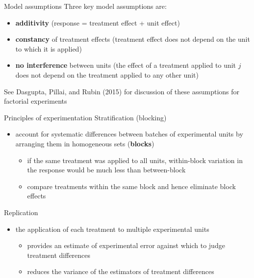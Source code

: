 \documentclass[
  ignorenonframetext,
]{beamer}
\providecommand{\tightlist}{%
  \setlength{\itemsep}{0pt}\setlength{\parskip}{0pt}}
\begin{document}
\begin{frame}{Model assumptions}
\protect\hypertarget{model-assumptions}{}
Three key model assumptions are:

\begin{itemize}
\tightlist
\item
  \textbf{additivity} (response = treatment effect + unit effect)
\item
  \textbf{constancy} of treatment effects (treatment effect does not
  depend on the unit to which it is applied)
\item
  \textbf{no interference} between units (the effect of a treatment
  applied to unit \(j\) does not depend on the treatment applied to any
  other unit)
\end{itemize}

See Dasgupta, Pillai, and Rubin (2015) for discussion of these
assumptions for factorial experiments
\end{frame}

\begin{frame}{Principles of experimentation}
\protect\hypertarget{principles-of-experimentation}{}
Stratification (blocking)

\begin{itemize}
\tightlist
\item
  account for systematic differences between batches of experimental
  units by arranging them in homogeneous sets (\textbf{blocks})

  \begin{itemize}
  \tightlist
  \item
    if the same treatment was applied to all units, within-block
    variation in the response would be much less than between-block
  \item
    compare treatments within the same block and hence eliminate block
    effects
  \end{itemize}
\end{itemize}

Replication

\begin{itemize}
\tightlist
\item
  the application of each treatment to multiple experimental units

  \begin{itemize}
  \tightlist
  \item
    provides an estimate of experimental error against which to judge
    treatment differences
  \item
    reduces the variance of the estimators of treatment differences
  \end{itemize}
\end{itemize}
\end{frame}
\end{document}
